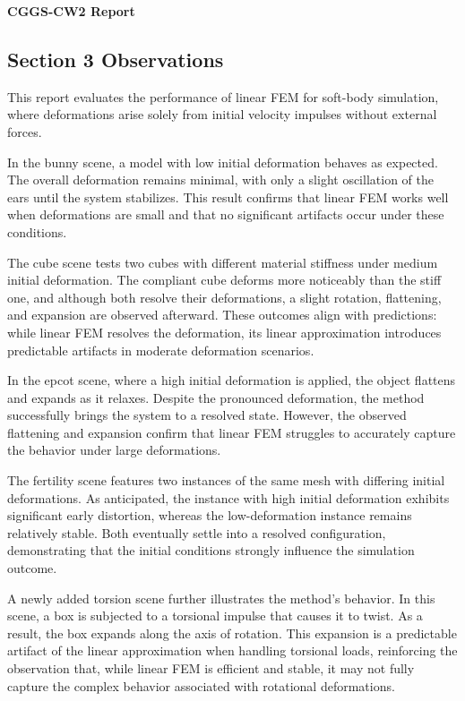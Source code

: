 \documentclass[11pt,a4paper]{article}
\begin{document}
 

{\Large \textbf{CGGS-CW2 Report}}\\
\indent {}

\subsection*{Section 3 Observations}

This report evaluates the performance of linear FEM for soft-body simulation, where deformations arise solely from initial velocity impulses without external forces. 

In the bunny scene, a model with low initial deformation behaves as expected. The overall deformation remains minimal, with only a slight oscillation of the ears until the system stabilizes. This result confirms that linear FEM works well when deformations are small and that no significant artifacts occur under these conditions.

The cube scene tests two cubes with different material stiffness under medium initial deformation. The compliant cube deforms more noticeably than the stiff one, and although both resolve their deformations, a slight rotation, flattening, and expansion are observed afterward. These outcomes align with predictions: while linear FEM resolves the deformation, its linear approximation introduces predictable artifacts in moderate deformation scenarios.

In the epcot scene, where a high initial deformation is applied, the object flattens and expands as it relaxes. Despite the pronounced deformation, the method successfully brings the system to a resolved state. However, the observed flattening and expansion confirm that linear FEM struggles to accurately capture the behavior under large deformations.

The fertility scene features two instances of the same mesh with differing initial deformations. As anticipated, the instance with high initial deformation exhibits significant early distortion, whereas the low-deformation instance remains relatively stable. Both eventually settle into a resolved configuration, demonstrating that the initial conditions strongly influence the simulation outcome.

A newly added torsion scene further illustrates the method’s behavior. In this scene, a box is subjected to a torsional impulse that causes it to twist. As a result, the box expands along the axis of rotation. This expansion is a predictable artifact of the linear approximation when handling torsional loads, reinforcing the observation that, while linear FEM is efficient and stable, it may not fully capture the complex behavior associated with rotational deformations.
\end{document}
